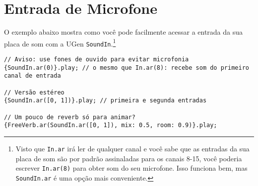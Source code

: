 \section{Entrada de Microfone}

O exemplo abaixo mostra como você pode facilmente acessar a entrada da sua placa de som com a UGen \texttt{SoundIn}.\footnote{Visto que \texttt{In.ar} irá ler de qualquer canal e você sabe que as entradas da sua placa de som são por padrão assinaladas para os canais 8-15, você poderia escrever \texttt{In.ar(8)} para obter som do seu microfone. Isso funciona bem, mas \texttt{SoundIn.ar} é uma opção mais conveniente.}

\begin{lstlisting}[style=SuperCollider-IDE, basicstyle=\scttfamily\footnotesize]
// Aviso: use fones de ouvido para evitar microfonia
{SoundIn.ar(0)}.play; // o mesmo que In.ar(8): recebe som do primeiro canal de entrada

// Versão estéreo
{SoundIn.ar([0, 1])}.play; // primeira e segunda entradas

// Um pouco de reverb só para animar?
{FreeVerb.ar(SoundIn.ar([0, 1]), mix: 0.5, room: 0.9)}.play;
\end{lstlisting}
